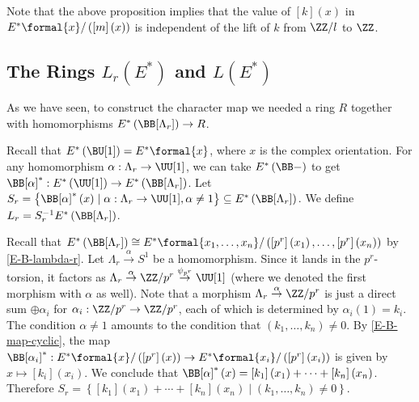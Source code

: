 \begin{remark}
	Note that the above proposition implies that the value of $[k]\left(x\right)$ in $E^*\formal{x}/\left(\left[m\right]\left(x\right)\right)$ is independent of the lift of $k$ from $\ZZ/l$ to $\ZZ$.
\end{remark}



\subsection{The Rings \texorpdfstring{$L_r\left(E^*\right)$}{Lr(E*)} and \texorpdfstring{$L\left(E^*\right)$}{L(E*)}}

As we have seen, to construct the character map we needed a ring $R$ together with homomorphisms $E^*\left(\BB[\Lambda_r]\right) \to R$.

Recall that $E^*\left(\BU[1]\right) = E^*\formal{x}$, where $x$ is the complex orientation.
For any homomorphism $\alpha: \Lambda_r \to \UU[1]$, we can take $E^*\left(\BB-\right)$ to get $\BB[\alpha]^*: E^*\left(\UU[1]\right) \to E^*\left(\BB[\Lambda_r]\right)$.
Let $S_r = \left\{ \BB[\alpha]^*\left(x\right) \mid \alpha: \Lambda_r \to \UU[1], \alpha \neq 1 \right\} \subseteq E^*\left(\BB[\Lambda_r]\right)$.
We define $L_r = S_r^{-1} E^*\left(\BB[\Lambda_r]\right)$.

Recall that $E^*\left(\BB[\Lambda_r]\right) \cong E^*\formal{x_1, \dotsc, x_n}/\left(\left[p^r\right]\left(x_1\right), \dotsc, \left[p^r\right]\left(x_n\right)\right)$ by \ref{E-B-lambda-r}.
Let $\Lambda_r \overset{\alpha}{\to} S^1$ be a homomorphism.
Since it lands in the $p^r$-torsion, it factors as $\Lambda_r \overset{\alpha}{\to} \ZZ/{p^r} \overset{\psi_{p^r}}{\to} \UU[1]$ (where we denoted the first morphism with $\alpha$ as well).
Note that a morphism $\Lambda_r \overset{\alpha}{\to} \ZZ/{p^r}$ is just a direct sum $\oplus \alpha_i$ for $\alpha_i: \ZZ/{p^r} \to \ZZ/{p^r}$, each of which is determined by $\alpha_i\left(1\right) = k_i$.
The condition $\alpha \neq 1$ amounts to the condition that $\left(k_1, \dotsc, k_n\right) \neq 0$.
By \ref{E-B-map-cyclic}, the map $\BB[\alpha_i]^*: E^*\formal{x}/\left(\left[p^r\right]\left(x\right)\right) \to E^*\formal{x_i}/\left(\left[p^r\right]\left(x_i\right)\right)$ is given by $x \mapsto [k_i]\left(x_i\right)$.
We conclude that $\BB[\alpha]^*\left(x\right) = [k_1]\left(x_1\right) + \cdots + [k_n]\left(x_n\right)$. 
Therefore $S_r = \left\{ [k_1]\left(x_1\right) + \cdots + [k_n]\left(x_n\right) \mid \left(k_1, \dotsc, k_n\right) \neq 0\right\}$.

